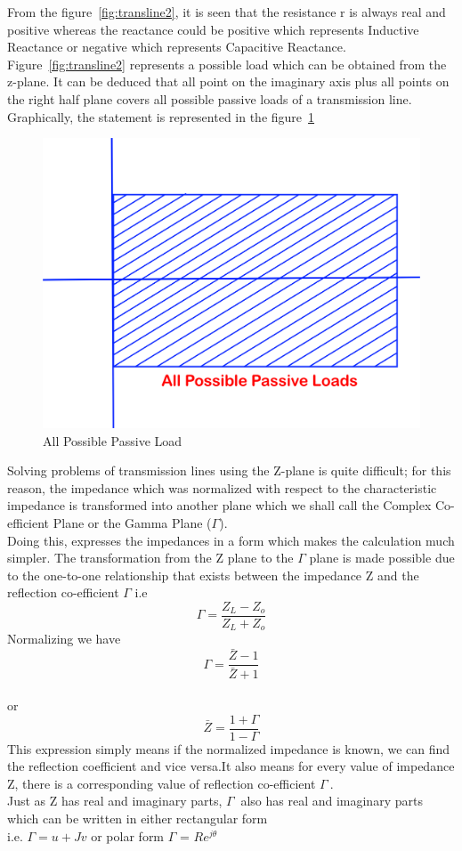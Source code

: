 From the figure~\ref{fig:transline2}, it is seen that the resistance r is always real and positive whereas the reactance could be positive which represents Inductive Reactance or negative which represents Capacitive Reactance.\\
Figure~\ref{fig:transline2} represents a possible load which can be obtained from the z-plane.  It can be deduced that all point on the imaginary axis plus all points on the right half plane covers all possible passive loads of a transmission line.
Graphically, the statement is represented in the figure~\ref{fig:oigvbnkliu}
\begin{figure}[h]
\centering
\includegraphics[width=0.6\linewidth]{./graphics/oigvbnkliu}
\caption{All Possible Passive Load}
\label{fig:oigvbnkliu}
\end{figure}

Solving problems of transmission lines using the Z-plane is quite difficult; for this reason, the impedance which was normalized with respect to the characteristic impedance is transformed into another plane which we shall call the Complex Co-efficient Plane or the Gamma Plane ($ \Gamma $).\\ Doing this, expresses the impedances in a form which makes the calculation much simpler.
The transformation from the Z plane to the $ \Gamma $ plane is made possible due to the one-to-one relationship that exists between the impedance Z and the reflection co-efficient $ \Gamma $ i.e
\begin{equation*}
\Gamma = \frac{Z_L - Z_o}{Z_L + Z_o}
\end{equation*}
Normalizing we have
\begin{equation*}
\Gamma= \frac{\bar{Z} - 1}{\bar{Z} + 1}
\end{equation*}\\ or
\begin{equation*}
\bar{Z}= \frac{1 + \Gamma}{1 - \Gamma}
\end{equation*}
This expression simply means if the normalized impedance is known, we can find the reflection coefficient and vice versa.It also means for every value of impedance Z, there is a corresponding value of reflection co-efficient $ \Gamma\ $.\\
Just as Z has real and imaginary parts, $ \Gamma\ $ also has real and imaginary parts which can be written in either rectangular form\\
i.e. $ \Gamma = u + Jv$ or polar form	$\Gamma$ = $Re^{j\theta}$


